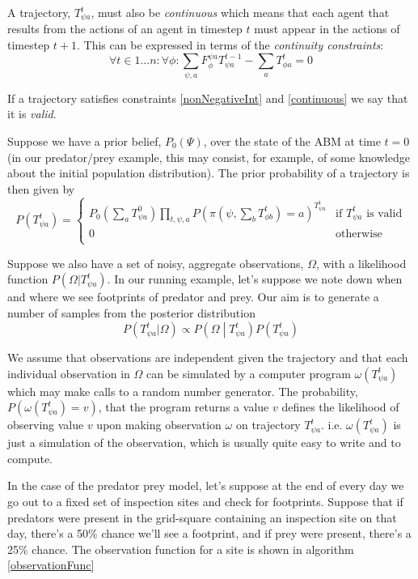 \documentclass{article}
\begin{document}
A trajectory, $T^t_{\psi a}$, must also be \textit{continuous} which means that each agent that results from the actions of an agent in timestep $t$ must appear in the actions of timestep $t+1$. This can be expressed in terms of the \textit{continuity constraints}:
\begin{equation}
\forall t \in 1 ... n:\forall \phi: \sum_{\psi, a} F_\phi^{\psi a}T^{t-1}_{\psi a} - \sum_a T^t_{\phi a} = 0
\label{continuous}
\end{equation}

If a trajectory satisfies constraints \ref{nonNegativeInt} and \ref{continuous} we say that it is \textit{valid}.

Suppose we have a prior belief, $P_0(\Psi)$, over the state of the ABM at time $t=0$ (in our predator/prey example, this may consist, for example, of some knowledge about the initial population distribution). The prior probability of a trajectory is then given by
\[
P(T^t_{\psi a}) =
\begin{cases}
P_0(\sum_aT^0_{\psi a}) \prod_{t, \psi, a} P(\pi(\psi,\sum_bT^{t}_{\phi b})=a)^{T^{t}_{\psi a}} & \text{if } T^t_{\psi a} \text{ is valid} \\
0 & \text{otherwise}\\
\end{cases}
\]

Suppose we also have a set of noisy, aggregate observations, $\Omega$, with a likelihood function $P(\Omega|T^t_{\psi a})$. In our running example, let's suppose we note down when and where we see footprints of predator and prey. Our aim is to generate a number of samples from the posterior distribution
\[
P(T^t_{\psi a}|\Omega) \propto P\left(\Omega \middle| T^{t}_{\psi a}\right)P(T^t_{\psi a})
\]

We assume that observations are independent given the trajectory and that each individual observation in $\Omega$ can be simulated by a computer program $\omega(T^t_{\psi a})$ which may make calls to a random number generator. The probability, $P(\omega(T^t_{\psi a}) = v)$, that the program returns a value $v$ defines the likelihood of observing value $v$ upon making observation $\omega$ on trajectory $T^t_{\psi a}$. i.e. $\omega(T^t_{\psi a})$ is just a simulation of the observation, which is usually quite easy to write and to compute. 

In the case of the predator prey model, let's suppose at the end of every day we go out to a fixed set of inspection sites and check for footprints. Suppose that if predators were present in the grid-square containing an inspection site on that day, there's a 50\% chance we'll see a footprint, and if prey were present, there's a 25\% chance. The observation function for a site is shown in algorithm \ref{observationFunc}
\end{document}
